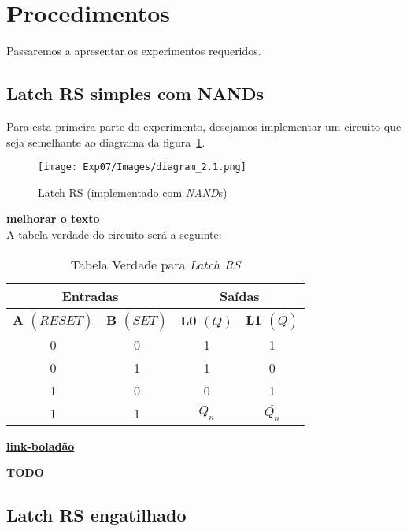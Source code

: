 \documentclass[12pt]{article}
\begin{document}
\section{Procedimentos}\label{sec:Procedimentos}

Passaremos a apresentar os experimentos requeridos.

\subsection{Latch RS simples com \textbf{NAND}s}\label{sec:2.1}

Para esta primeira parte do experimento, desejamos implementar um circuito que
seja semelhante ao diagrama da figura~\ref{fig:diagram_2.1.png}.

\begin{figure}[H]
  \centering
  \texttt{[image: Exp07/Images/diagram\_2.1.png]}
  \caption{Latch RS (implementado com \emph{NAND}s)}\label{fig:diagram_2.1.png}
\end{figure}

\textbf{melhorar o texto}\\
A tabela verdade do circuito será a seguinte:

\begin{table}[H]
    \centering
    \caption{Tabela Verdade para \emph{Latch RS}}
    \begin{tabular}{|c|c||c|c|}\hline
      \multicolumn{2}{|c||}{Entradas} & \multicolumn{2}{|c|}{Saídas} \\\hline
      \textbf{A $(\overline{RESET})$} & \textbf{B $(\overline{SET})$} & \textbf{L0 $(Q)$} & \textbf{L1 $(\overline{Q})$} \\\hline
      0 & 0 & 1 & 1 \\\hline
      0 & 1 & 1 & 0 \\\hline
      1 & 0 & 0 & 1 \\\hline
      1 & 1 & $Q_{n}$ & $\overline{Q_{n}}$ \\\hline
    \end{tabular}\label{tab:truth_table_latch_rs}
\end{table}


\href{link-boladão}{\textbf{link-boladão}}

\textbf{TODO}

\subsection{Latch RS engatilhado}\label{sec:2.2}
\end{document}
